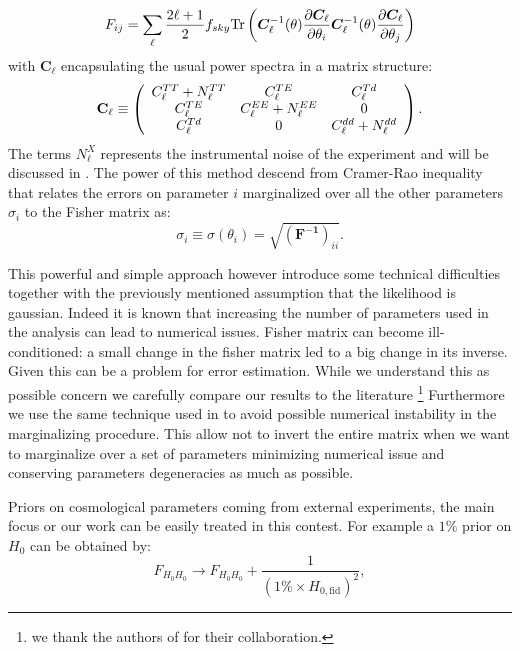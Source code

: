 \documentclass[aps,prl,preprint,groupedaddress]{revtex4-1}
\begin{document}
\begin{equation}
 F_{ij} = \sum_\ell \frac{2\ell+1}{2} f_{sky} {\rm Tr} \left(  \boldsymbol{C}^{-1}_\ell( \theta) \frac{\partial \boldsymbol{C}_\ell}{\partial \theta_i} \boldsymbol{C}^{-1}_\ell( \theta) \frac{\partial \boldsymbol{C}_\ell}{\partial \theta_j}  \right)
 \end{equation}
 with $\boldsymbol{C}_\ell$ encapsulating the usual power spectra in a matrix structure:
 \begin{eqnarray}
 	\centering
		\mathbf{C}_\ell \equiv \left( \begin{array}{ccc}C_\ell^{TT} + N_\ell^{TT} & C_\ell^{TE} & C_\ell^{Td} \\ C_\ell^{TE} & C_\ell^{EE} + N_\ell^{EE} & 0 \\ C_\ell^{Td} & 0 & C_\ell^{dd} + N_\ell^{dd}\end{array}\right).
	\label{eq:cov_definition}
\end{eqnarray}
The terms $N_\ell^{X}$ represents the instrumental noise of the experiment and will be discussed in .
The power of this method descend from Cramer-Rao inequality that relates the errors on parameter $i$ marginalized over all the other parameters $\sigma_i$ to the Fisher matrix as:
\begin{equation}
\sigma_i \equiv \sigma (\theta_i) = \sqrt{(\mathbf{ F^{-1}})_{ii}}.
\label{eqn:cramer-rao}
\end{equation}

This powerful and simple approach however introduce some technical difficulties together with the previously mentioned assumption that the likelihood is gaussian. Indeed it is known that increasing the number of parameters used in the analysis can lead to numerical issues. Fisher matrix  can become ill-conditioned: a small change in the fisher matrix led to a big change in its inverse. Given  this can be a problem for error estimation. While we understand this as possible concern we carefully compare our results to the literature  \footnote{we thank the authors of \cite{pan:2015} for their collaboration.}
Furthermore we use the same technique used in \cite{2006astro.ph..9591A} to avoid possible numerical instability in the marginalizing procedure. This allow not to invert the entire matrix when we want to marginalize over a set of parameters minimizing numerical issue and conserving parameters degeneracies as much as possible.

Priors on cosmological parameters coming from external experiments, the main focus or our work can be easily treated in this contest.
For example a $1\%$ prior on $H_{0}$ can be obtained by:
\begin{equation}
F_{H_0 H_0} \rightarrow F_{H_0 H_0} + \frac{1}{(1\% \times H_{0,\text{fid}})^2}, 
\end{equation}
\end{document}
